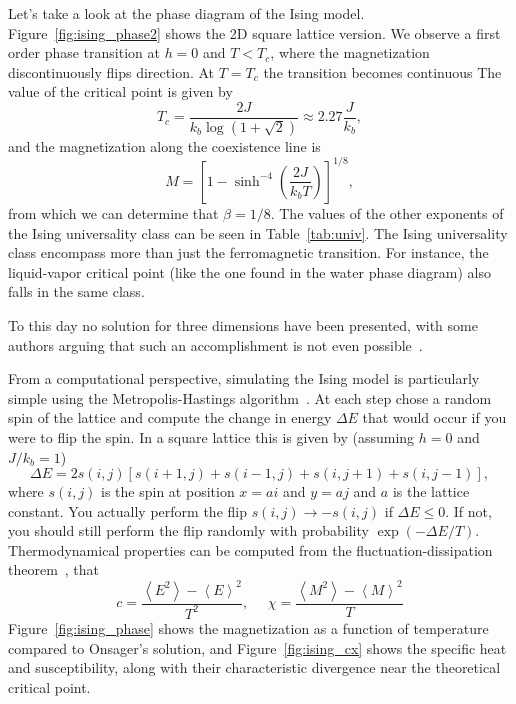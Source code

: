 Let's take a look at the phase diagram of the Ising model.
Figure~\ref{fig:ising_phase2} shows the 2D square lattice version. We observe a
first order phase transition at $h=0$ and $T<T_c$, where the magnetization
discontinuously flips direction. At $T=T_c$ the transition becomes continuous
The value of the critical point is given by
\begin{equation}
    T_{c}=
    \frac{2J}{k_{b}\log\left(1+\sqrt{2}\right)}
    \approx2.27\frac{J}{k_{b}},
\end{equation}
and the magnetization along the coexistence line is~\cite{Yang1952}
\begin{equation}
    M={\left[1-\sinh^{-4}\left(\frac{2J}{k_{b}T}\right)\right]}^{1/8},
\end{equation}
from which we can determine that $\beta=1/8$. The values of the other exponents
of the Ising universality class can be seen in Table~\ref{tab:univ}. The Ising
universality class encompass more than just the ferromagnetic transition. For
instance, the liquid-vapor critical point (like the one found in the water
phase diagram) also falls in the same class.

To this day no solution for three dimensions have been presented, with some
authors arguing that such an accomplishment is not even
possible~\cite{Istrail2000}.

From a computational perspective, simulating the Ising model is particularly
simple using the Metropolis-Hastings algorithm~\cite{Hastings1970}. At each
step chose a random spin of the lattice and compute the change in energy
$\Delta E$ that would occur if you were to flip the spin. In a square lattice
this is given by (assuming $h=0$ and $J/k_b=1$)
\begin{equation}
    \Delta E=2s\left(i,j\right)\left[s\left(i+1,j\right)+
    s\left(i-1,j\right)+s\left(i,j+1\right)+s\left(i,j-1\right)\right],
\end{equation}
where $s(i,j)$ is the spin at position $x=ai$ and $y=aj$ and $a$ is the
lattice constant. You actually perform the flip $s(i,j)\rightarrow -s(i,j)$ if
$\Delta E\leq 0$. If not, you should still perform the flip randomly with
probability $\exp(-\Delta E / T)$. Thermodynamical properties can be computed from
the fluctuation-dissipation theorem~\cite{Nishimori2011}, that 
\begin{equation}
    c=\frac{\left\langle E^{2}\right\rangle -\left\langle E\right\rangle ^{2}}{T^2},
    \,\,\,\,\,\,\,\,
    \chi=\frac{\left\langle M^{2}\right\rangle -\left\langle M\right\rangle ^{2}}{T}
\end{equation}
Figure~\ref{fig:ising_phase} shows the magnetization as a function of
temperature compared to Onsager's solution, and Figure~\ref{fig:ising_cx} shows the
specific heat and susceptibility, along with their characteristic divergence
near the theoretical critical point.


